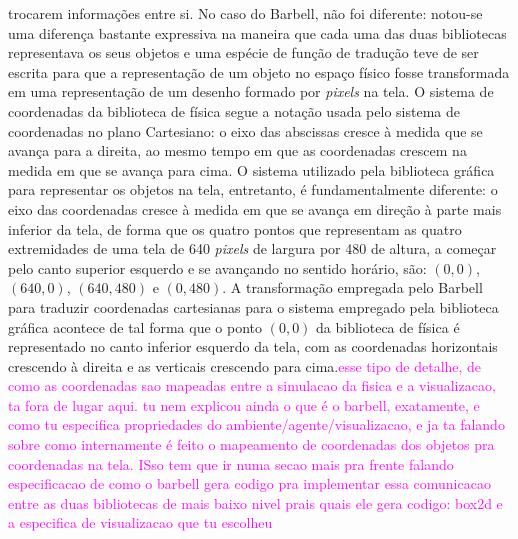 \documentclass[cic,tc]{iiufrgs}
\newcommand\bruno[1]{\textcolor{magenta}{#1}}
\begin{document}
    trocarem informações entre si. No caso do Barbell, não foi diferente: notou-se uma diferença bastante expressiva na maneira que cada uma das duas bibliotecas
    representava os seus objetos e uma espécie de função de tradução teve de ser escrita para que a representação de um objeto no espaço físico fosse transformada
    em uma representação de um desenho formado por \textit{pixels} na tela. O sistema de coordenadas da biblioteca de física segue a notação usada pelo sistema
    de coordenadas no plano Cartesiano: o eixo das abscissas cresce à medida que se avança para a direita, ao mesmo tempo em que as coordenadas crescem na medida
     em que se avança para cima. O sistema utilizado pela biblioteca gráfica para representar os objetos na tela, entretanto, é fundamentalmente diferente: o eixo
     das coordenadas cresce à medida em que se avança em direção à parte mais inferior da tela, de forma que os quatro pontos que representam as quatro extremidades
     de uma tela de 640 \textit{pixels} de largura por 480 de altura, a começar pelo canto superior esquerdo e se avançando no sentido horário, são: $(0,0)$, $(640,0)$,
     $(640,480)$ e $(0,480)$. A transformação empregada pelo Barbell para traduzir coordenadas cartesianas para o sistema empregado pela biblioteca gráfica acontece
     de tal forma que o ponto $(0,0)$ da biblioteca de física é representado no canto inferior esquerdo da tela, com as coordenadas horizontais crescendo à direita
     e as verticais crescendo para cima.\bruno{esse tipo de detalhe, de como as coordenadas sao mapeadas entre a simulacao da fisica e a visualizacao, ta fora de lugar aqui. tu nem explicou ainda o que é o barbell, exatamente, e como tu especifica propriedades do ambiente/agente/visualizacao, e ja ta falando sobre como internamente é feito o mapeamento de coordenadas dos objetos pra coordenadas na tela. ISso tem que ir numa secao mais pra frente falando especificacao de como o barbell gera codigo pra implementar essa comunicacao entre as duas bibliotecas de mais baixo nivel prais quais ele gera codigo: box2d e a especifica de visualizacao que tu escolheu}
    
\end{document}
